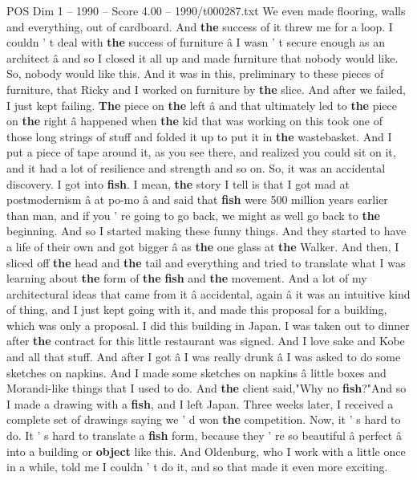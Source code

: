 \begin{textsample}{POS Dim 1 – 1990 – Score 4.00 – 1990/t000287.txt}
We even made flooring, walls and everything, out of cardboard.
And \textbf{the} success of it threw me for a loop.
I couldn ' t deal with \textbf{the} success of furniture â I wasn ' t secure enough as an architect â and so I closed it all up and made furniture that nobody would like.
So, nobody would like this.
And it was in this, preliminary to these pieces of furniture, that Ricky and I worked on furniture by \textbf{the} slice.
And after we failed, I just kept failing. \textbf{The} piece on \textbf{the} left â and that ultimately led to \textbf{the} piece on \textbf{the} right â happened when \textbf{the} kid that was working on this took one of those long strings of stuff and folded it up to put it in \textbf{the} wastebasket.
And I put a piece of tape around it, as you see there, and realized you could sit on it, and it had a lot of resilience and strength and so on.
So, it was an accidental discovery.
I got into \textbf{fish}.
I mean, \textbf{the} story I tell is that I got mad at postmodernism â at po-mo â and said that \textbf{fish} were 500 million years earlier than man, and if you ' re going to go back, we might as well go back to \textbf{the} beginning.
And so I started making these funny things.
And they started to have a life of their own and got bigger â as \textbf{the} one glass at \textbf{the} Walker.
And then, I sliced off \textbf{the} head and \textbf{the} tail and everything and tried to translate what I was learning about \textbf{the} form of \textbf{the} \textbf{fish} and \textbf{the} movement.
And a lot of my architectural ideas that came from it â accidental, again â it was an intuitive kind of thing, and I just kept going with it, and made this proposal for a building, which was only a proposal.
I did this building in Japan.
I was taken out to dinner after \textbf{the} contract for this little restaurant was signed.
And I love sake and Kobe and all that stuff.
And after I got â I was really drunk â I was asked to do some sketches on napkins.
And I made some sketches on napkins â little boxes and Morandi-like things that I used to do.
And \textbf{the} client said,"Why no \textbf{fish}?"And so I made a drawing with a \textbf{fish}, and I left Japan.
Three weeks later, I received a complete set of drawings saying we ' d won \textbf{the} competition.
Now, it ' s hard to do.
It ' s hard to translate a \textbf{fish} form, because they ' re so beautiful â perfect â into a building or \textbf{object} like this.
And Oldenburg, who I work with a little once in a while, told me I couldn ' t do it, and so that made it even more exciting.

\end{textsample}

